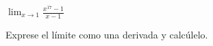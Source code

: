 \setcounter{enumi}{83}
\item $\displaystyle \lim_{x \to 1} \frac{x^{17} - 1}{x - 1}$
\par
Exprese el límite como una derivada y calcúlelo.
